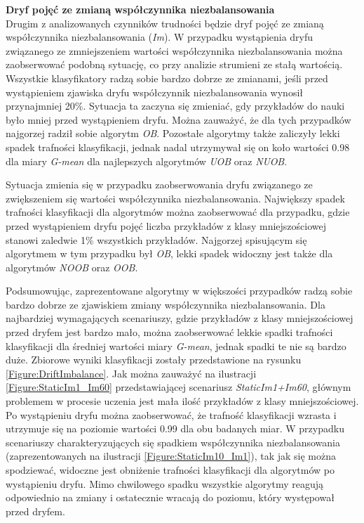 \noindent \textbf{Dryf pojęć ze zmianą współczynnika niezbalansowania}\\

\noindent Drugim z analizowanych czynników trudności będzie dryf pojęć ze zmianą współczynnika niezbalansowania (\textit{Im}). W przypadku wystąpienia dryfu związanego ze zmniejszeniem wartości współczynnika niezbalansowania można zaobserwować podobną sytuację, co przy analizie strumieni ze stałą wartością. Wszystkie klasyfikatory radzą sobie bardzo dobrze ze zmianami, jeśli przed wystąpieniem zjawiska dryfu współczynnik niezbalansowania wynosił przynajmniej 20\%. Sytuacja ta zaczyna się zmieniać, gdy przykładów do nauki było mniej przed wystąpieniem dryfu. Można zauważyć, że dla tych przypadków najgorzej radził sobie algorytm \textit{OB}. Pozostałe algorytmy także zaliczyły lekki spadek trafności klasyfikacji, jednak nadal utrzymywał się on koło wartości 0.98 dla miary \textit{G-mean} dla najlepszych algorytmów \textit{UOB} oraz \textit{NUOB}.

Sytuacja zmienia się w przypadku zaobserwowania dryfu związanego ze zwiększeniem się wartości współczynnika niezbalansowania. Największy spadek trafności klasyfikacji dla algorytmów można zaobserwować dla przypadku, gdzie przed wystąpieniem dryfu pojęć liczba przykładów z klasy mniejszościowej stanowi zaledwie 1\% wszystkich przykładów. Najgorzej spisującym się algorytmem w tym przypadku był \textit{OB}, lekki spadek widoczny jest także dla algorytmów \textit{NOOB} oraz \textit{OOB}.

Podsumowując, zaprezentowane algorytmy w większości przypadków radzą sobie bardzo dobrze ze zjawiskiem zmiany współczynnika niezbalansowania. Dla najbardziej wymagających scenariuszy, gdzie przykładów z klasy mniejszościowej przed dryfem jest bardzo mało, można zaobserwować lekkie spadki trafności klasyfikacji dla średniej wartości miary \textit{G-mean}, jednak spadki te nie są bardzo duże. Zbiorowe wyniki klasyfikacji zostały przedstawione na rysunku \ref{Figure:DriftImbalance}. Jak można zauważyć na ilustracji \ref{Figure:StaticIm1_Im60} przedstawiającej scenariusz \textit{StaticIm1+Im60}, głównym problemem w procesie uczenia jest mała ilość przykładów z klasy mniejszościowej. Po wystąpieniu dryfu można zaobserwować, że trafność klasyfikacji wzrasta i utrzymuje się na poziomie wartości 0.99 dla obu badanych miar. W przypadku scenariuszy charakteryzujących się spadkiem współczynnika niezbalansowania (zaprezentowanych na ilustracji \ref{Figure:StaticIm10_Im1}), tak jak się można  spodziewać, widoczne jest obniżenie trafności klasyfikacji dla algorytmów po wystąpieniu dryfu. Mimo chwilowego spadku wszystkie algorytmy reagują odpowiednio na zmiany i ostatecznie wracają do poziomu, który występował przed dryfem.


